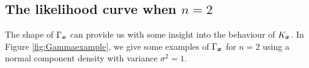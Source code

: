 

	\subsection{The likelihood curve when \texorpdfstring{$n = 2$}{n = 2}}
		The shape of $\Gamma_{\bm{{x}}}$ can provide us with some insight into the behaviour of $K_{\bm{{x}}}$. In Figure \ref{fig:Gammaexample}, we give some examples of $\Gamma_{\bm{{x}}}$ for $n=2$ using a normal component density with variance $\sigma^2 = 1$. 
